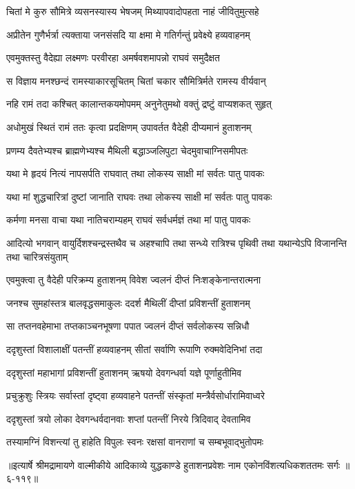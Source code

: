 \twolineshloka
{चितां मे कुरु सौमित्रे व्यसनस्यास्य भेषजम्}
{मिथ्यापवादोपहता नाहं जीवितुमुत्सहे} %

\twolineshloka
{अप्रीतेन गुणैर्भर्त्रा त्यक्ताया जनसंसदि}
{या क्षमा मे गतिर्गन्तुं प्रवेक्ष्ये हव्यवाहनम्} %

\twolineshloka
{एवमुक्तस्तु वैदेह्या लक्ष्मणः परवीरहा}
{अमर्षवशमापन्नो राघवं समुदैक्षत} %

\twolineshloka
{स विज्ञाय मनश्छन्दं रामस्याकारसूचितम्}
{चितां चकार सौमित्रिर्मते रामस्य वीर्यवान्} %

\twolineshloka
{नहि रामं तदा कश्चित् कालान्तकयमोपमम्}
{अनुनेतुमथो वक्तुं द्रष्टुं वाप्यशकत् सुहृत्} %

\twolineshloka
{अधोमुखं स्थितं रामं ततः कृत्वा प्रदक्षिणम्}
{उपावर्तत वैदेही दीप्यमानं हुताशनम्} %

\twolineshloka
{प्रणम्य दैवतेभ्यश्च ब्राह्मणेभ्यश्च मैथिली}
{बद्धाञ्जलिपुटा चेदमुवाचाग्निसमीपतः} %

\twolineshloka
{यथा मे हृदयं नित्यं नापसर्पति राघवात्}
{तथा लोकस्य साक्षी मां सर्वतः पातु पावकः} %

\twolineshloka
{यथा मां शुद्धचारित्रां दुष्टां जानाति राघवः}
{तथा लोकस्य साक्षी मां सर्वतः पातु पावकः} %

\twolineshloka
{कर्मणा मनसा वाचा यथा नातिचराम्यहम्}
{राघवं सर्वधर्मज्ञं तथा मां पातु पावकः} %

\threelineshloka
{आदित्यो भगवान् वायुर्दिशश्चन्द्रस्तथैव च}
{अहश्चापि तथा सन्ध्ये रात्रिश्च पृथिवी तथा}
{यथान्येऽपि विजानन्ति तथा चारित्रसंयुताम्} %

\twolineshloka
{एवमुक्त्वा तु वैदेही परिक्रम्य हुताशनम्}
{विवेश ज्वलनं दीप्तं निःशङ्केनान्तरात्मना} %

\twolineshloka
{जनश्च सुमहांस्तत्र बालवृद्धसमाकुलः}
{ददर्श मैथिलीं दीप्तां प्रविशन्तीं हुताशनम्} %

\twolineshloka
{सा तप्तनवहेमाभा तप्तकाञ्चनभूषणा}
{पपात ज्वलनं दीप्तं सर्वलोकस्य सन्निधौ} %

\twolineshloka
{ददृशुस्तां विशालाक्षीं पतन्तीं हव्यवाहनम्}
{सीतां सर्वाणि रूपाणि रुक्मवेदिनिभां तदा} %

\twolineshloka
{ददृशुस्तां महाभागां प्रविशन्तीं हुताशनम्}
{ऋषयो देवगन्धर्वा यज्ञे पूर्णाहुतीमिव} %

\twolineshloka
{प्रचुक्रुशुः स्त्रियः सर्वास्तां दृष्ट्वा हव्यवाहने}
{पतन्तीं संस्कृतां मन्त्रैर्वसोर्धारामिवाध्वरे} %

\twolineshloka
{ददृशुस्तां त्रयो लोका देवगन्धर्वदानवाः}
{शप्तां पतन्तीं निरये त्रिदिवाद् देवतामिव} %

\twolineshloka
{तस्यामग्निं विशन्त्यां तु हाहेति विपुलः स्वनः}
{रक्षसां वानराणां च सम्बभूवाद्भुतोपमः} %


॥इत्यार्षे श्रीमद्रामायणे वाल्मीकीये आदिकाव्ये युद्धकाण्डे हुताशनप्रवेशः नाम एकोनविंशत्यधिकशततमः सर्गः ॥६-११९॥
